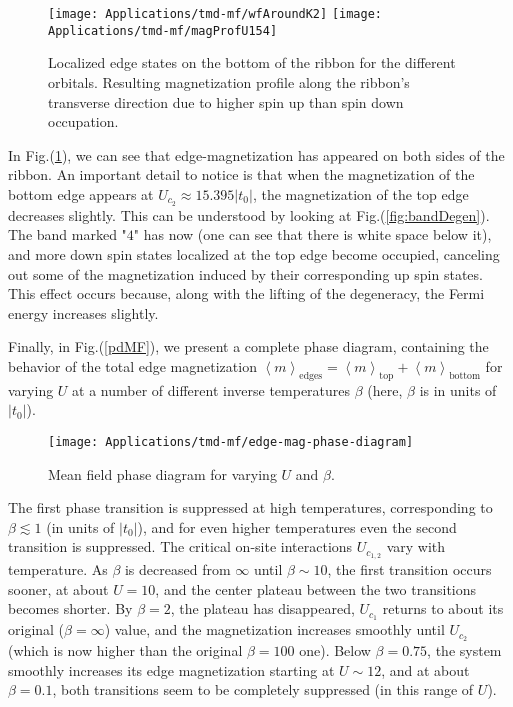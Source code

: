 \begin{figure}[H]
\hspace{1cm}
\texttt{[image: Applications/tmd-mf/wfAroundK2]}
\texttt{[image: Applications/tmd-mf/magProfU154]}
	\caption[Localized edge states on the bottom of the ribbon for the different orbitals. Resulting magnetization profile along the ribbon's transverse direction due to higher spin up than spin down occupation.]{Localized edge states on the bottom of the ribbon for the different orbitals. Resulting magnetization profile along the ribbon's transverse direction due to higher spin up than spin down occupation.}
	\label{fig:wfs2}
\end{figure}
In Fig.(\ref{fig:wfs2}), we can see that edge-magnetization has appeared on both sides of the ribbon.
An important detail to notice is that when the magnetization of the bottom edge appears at $U_{c_2} \approx 15.395 |t_0|$, the magnetization of the top edge decreases slightly.
This can be understood by looking at Fig.(\ref{fig:bandDegen}).
The band marked "$4$" has now  (one can see that there is white space below it), and more down spin states localized at the top edge become occupied, canceling out some of the magnetization induced by their corresponding up spin states.
This effect occurs because, along with the lifting of the degeneracy, the Fermi energy increases slightly.

Finally, in Fig.(\ref{pdMF}), we present a complete phase diagram, containing the behavior of the total edge magnetization $\left\langle m \right\rangle_{\text{edges}} = \left\langle m \right\rangle_{\text{top}} + \left\langle m \right\rangle_{\text{bottom}}$ for varying $U$ at a number of different inverse temperatures $\beta$ (here, $\beta$ is in units of $| t_0 |$).
\begin{figure}[H]
\centering
\texttt{[image: Applications/tmd-mf/edge-mag-phase-diagram]}
	\caption[Mean field phase diagram for varying $U$ and $\beta$]{Mean field phase diagram for varying $U$ and $\beta$.}
	\label{fig:pdMF}
\end{figure}

The first phase transition is suppressed at high temperatures, corresponding to $\beta \lesssim 1$ (in units of $| t_0 |$), and for even higher temperatures even the second transition is suppressed.
The critical on-site interactions $U_{c_{1, 2}}$ vary with temperature.
As $\beta$ is decreased from $\infty$ until $\beta \sim 10$, the first transition occurs sooner, at about $U = 10$, and the center plateau between the two transitions becomes shorter.
By $\beta = 2$, the plateau has disappeared, $U_{c_1}$ returns to about its original ($\beta = \infty$) value, and the magnetization increases smoothly until $U_{c_2}$ (which is now higher than the original $\beta = 100$ one).
Below $\beta = 0.75$, the system smoothly increases its edge magnetization starting at $U \sim 12$, and at about $\beta = 0.1$, both transitions seem to be completely suppressed (in this range of $U$).